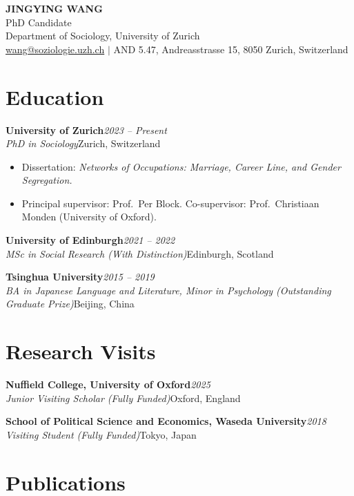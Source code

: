 \documentclass[11pt,a4paper]{article}
\newcommand{\entry}[4]{%
    \noindent\textbf{#1}\hfill\textit{\color{lighttext}#2}\\
    \textit{\color{lighttext}#3}\hfill{\color{lighttext}#4}\par\vspace{0.05em}
}
\begin{document}
\begin{center}
    {\LARGE\bfseries\color{accent} JINGYING WANG}\\[0.3em]
    {\color{lighttext} PhD Candidate}\\
    {\color{lighttext} Department of Sociology, University of Zurich}\\[0.3em]
    {\small\color{lighttext}
        \href{mailto:wang@soziologie.uzh.ch}{wang@soziologie.uzh.ch}
        \enspace$\vert$\enspace
        AND 5.47, Andreasstrasse 15, 8050 Zurich, Switzerland
    }
\end{center}

\section{Education}

\entry{University of Zurich}{2023 -- Present}
      {PhD in Sociology}{Zurich, Switzerland}
\begin{itemize}
    \item Dissertation: \textit{Networks of Occupations: Marriage, Career Line, and Gender Segregation.}
    \item Principal supervisor: Prof.\ Per Block. Co-supervisor: Prof.\ Christiaan Monden (University of Oxford).
\end{itemize}

\vspace{0.3em}
\entry{University of Edinburgh}{2021 -- 2022}
      {MSc in Social Research (With Distinction)}{Edinburgh, Scotland}

\vspace{0.3em}
\entry{Tsinghua University}{2015 -- 2019}
      {BA in Japanese Language and Literature, Minor in Psychology (Outstanding Graduate Prize)}{Beijing, China}

\section{Research Visits}

\entry{Nuffield College, University of Oxford}{2025}
      {Junior Visiting Scholar (Fully Funded)}{Oxford, England}

\vspace{0.3em}
\entry{School of Political Science and Economics, Waseda University}{2018}
      {Visiting Student (Fully Funded)}{Tokyo, Japan}

\section{Publications}
\end{document}

